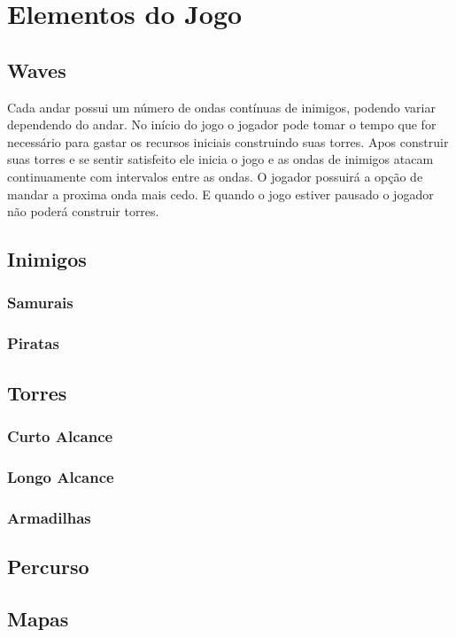 \documentclass[10pt,a4paper]{article}
\begin{document}
\section{Elementos do Jogo}
\subsection{Waves}
Cada andar possui um número de ondas contínuas de inimigos, podendo variar dependendo do andar. No início do jogo o jogador pode tomar o tempo que for necessário para gastar os recursos iniciais construindo suas torres. Apos construir suas torres e se sentir satisfeito ele inicia o jogo e as ondas de inimigos atacam continuamente com intervalos entre as ondas.
O jogador possuirá a opção de mandar a proxima onda mais cedo. E quando o jogo estiver pausado o jogador não poderá construir torres.
\subsection{Inimigos}
\subsubsection{Samurais}
\subsubsection{Piratas}

\subsection{Torres}
\subsubsection{Curto Alcance}
\subsubsection{Longo Alcance}
\subsubsection{Armadilhas}

\subsection{Percurso}
\subsection{Mapas}
\end{document}
